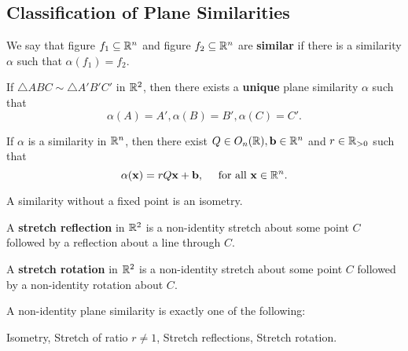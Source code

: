 \subsection{Classification of Plane Similarities}

\begin{definition}
    We say that figure \(f_1 \subseteq \mathbb{R}^n\) and figure \(f_2 \subseteq \mathbb{R}^n\) are \textbf{similar} if there is a similarity \(\alpha\) such that \(\alpha(f_1) = f_2\).
\end{definition}

\begin{theorem}
    If \(\triangle ABC \sim \triangle A'B'C'\) in \(\mathbb{R}^2\), then there exists a \textbf{unique} plane similarity \(\alpha\) such that
    \[\alpha(A) = A', \alpha(B) = B', \alpha(C) = C'.\]
\end{theorem}

\begin{theorem}
    If \(\alpha\) is a similarity in \(\mathbb{R}^n\), then there exist \(Q \in O_n(\mathbb{R}), \mathbf{b} \in \mathbb{R}^n\) and \(r \in \mathbb{R}_{> 0}\) such that
    \[\alpha(\mathbf{x}) = rQ\mathbf{x} + \mathbf{b}, \quad \text{ for all } \mathbf{x} \in \mathbb{R}^n.\]
\end{theorem}

\begin{lemma}
    A similarity without a fixed point is an isometry.
\end{lemma}

\begin{definition}
    \begin{statements}{}
        \item A \textbf{stretch reflection} in \(\mathbb{R}^2\) is a non-identity stretch about some point \(C\) followed by a reflection about a line through \(C\).
        \item A \textbf{stretch rotation} in \(\mathbb{R}^2\) is a non-identity stretch about some point \(C\) followed by a non-identity rotation about \(C\).
    \end{statements}
\end{definition}

\begin{theorem}
    A non-identity plane similarity is exactly one of the following:
    \begin{center}
        Isometry, \quad Stretch of ratio \(r \neq 1\), \quad Stretch reflections, \quad Stretch rotation.
    \end{center}
\end{theorem}

